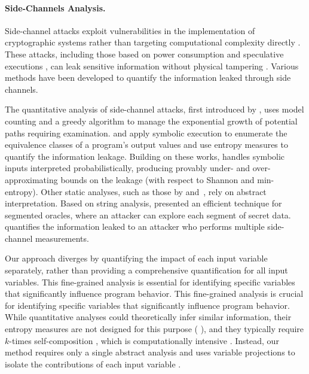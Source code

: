 \paragraph{Side-Channels Analysis.}
Side-channel attacks exploit vulnerabilities in the implementation of cryptographic systems rather than targeting computational complexity directly . These attacks, including those based on power consumption  and speculative executions , can leak sensitive information without physical tampering . Various methods have been developed to quantify the information leaked through side channels.

The quantitative analysis of side-channel attacks, first introduced by , uses model counting and a greedy algorithm to manage the exponential growth of potential paths requiring examination.  and  apply symbolic execution to enumerate the equivalence classes of a program's output values and use entropy measures to quantify the information leakage. Building on these works,  handles symbolic inputs interpreted probabilistically, producing provably under- and over-approximating bounds on the leakage (with respect to Shannon and min-entropy). Other static analyses, such as those by  and~, rely on abstract interpretation. Based on string analysis,  presented an efficient technique for segmented oracles, where an attacker can explore each segment of secret data.  quantifies the information leaked to an attacker who performs multiple side-channel measurements.

Our approach diverges by quantifying the impact of each input variable separately, rather than providing a comprehensive quantification for all input variables.
This fine-grained analysis is essential for identifying specific variables that significantly influence program behavior.
This fine-grained analysis is crucial for identifying specific variables that significantly influence program behavior. While quantitative analyses could theoretically infer similar information, their entropy measures are not designed for this purpose (\cf{} ), and they typically require $k$-times self-composition , which is computationally intensive . Instead, our method requires only a single abstract analysis and uses variable projections to isolate the contributions of each input variable .

